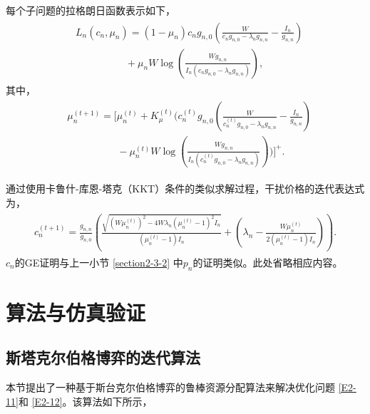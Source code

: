 每个子问题的拉格朗日函数表示如下，
\begin{eqnarray}\label{28}
 \begin{array}{lll}
&\!\!\!\textit{L}_n(c_n, \mu_n)=(1-\mu_n)c_{n} g_{n,0}\left(\frac{W}{c_n g_{n,0}-\lambda_n g_{n,n}}-\frac{I_n}{g_{n,n}}\right)\\
&\quad \quad \quad \quad \quad +\mu_n W \log\left(\frac{W g_{n,n}}{I_n (c_n g_{n,0}-\lambda_n g_{n,n}) }\right) ,
\end{array}
\end{eqnarray}
其中，
\begin{eqnarray}\label{29}
 \begin{array}{lll}
&\!\!\!\mu_n^{(t+1)}=\Big[\mu_n^{(t)}\!\!+\!K_{\mu}^{(t)}\big(c_{n}^{(t)} g_{n,0}(\frac{W}{c_n^{(t)} g_{n,0}-\lambda_n g_{n,n}}-\frac{I_n}{g_{n,n}})\\
&\quad \quad \quad \quad \quad -\mu_n^{(t)} W \log(\frac{W g_{n,n}}{I_n (c_n^{(t)} g_{n,0}-\lambda_n g_{n,n}) })\big)\Big]^+ .
\end{array}
\end{eqnarray}

通过使用卡鲁什-库恩-塔克（KKT）条件的类似求解过程，干扰价格的迭代表达式为，
\begin{eqnarray}\label{30}
 \begin{array}{lll}
\!\!\!\!c_n^{(t+1)}\!\!\!=\!\!\frac{g_{n,n}}{g_{n,0}}\!\!\left(\!\!\frac{ \sqrt{(W\mu_n^{(t)})^{2}\!-4W\lambda_n(\mu_n^{(t)}\!\!-\!1)^2I_n}}{(\mu_n^{(t)}-1)I_n}\!\!+\!\! (\lambda_n\!\!\!-\!\!\frac{W\mu_n^{(t)}}{2(\mu_n^{(t)}\!\!-\!1)I_n})\!\!\right).\!\!\!\!
\end{array}
\end{eqnarray}
$c_n$的GE证明与上一小节 \ref{section2-3-2} 中$p_n$的证明类似。此处省略相应内容。
\section{算法与仿真验证}\label{section2-4}
\subsection{斯塔克尔伯格博弈的迭代算法}\label{section2-4-1}
本节提出了一种基于斯台克尔伯格博弈的鲁棒资源分配算法来解决优化问题 \eqref{E2-11}和 \eqref{E2-12}。该算法如下所示，

